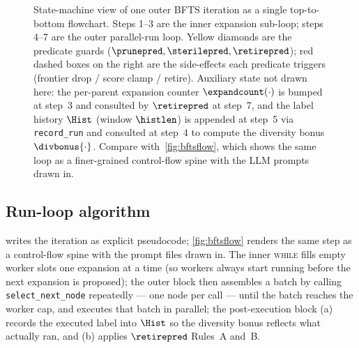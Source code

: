 \begin{figure}[t]
  \centering
  \resizebox{0.85\columnwidth}{!}{}
  \caption{State-machine view of one outer BFTS iteration as a single
           top-to-bottom flowchart. Steps 1--3 are the inner expansion
           sub-loop; steps 4--7 are the outer parallel-run loop. Yellow
           diamonds are the predicate guards ($\prunepred,\sterilepred,\retirepred$);
           red dashed boxes on the right are the side-effects each
           predicate triggers (frontier drop / score clamp / retire).
           Auxiliary state not drawn here: the per-parent expansion
           counter $\expandcount(\cdot)$ is bumped at step~3 and
           consulted by $\retirepred$ at step~7, and the label history
           $\Hist$ (window $\histlen$) is appended at step~5 via
           \texttt{record\_run} and consulted at step~4 to compute the
           diversity bonus $\divbonus{\cdot}$.
           Compare with~\cref{fig:bftsflow}, which shows the same loop
           as a finer-grained control-flow spine with the LLM prompts
           drawn in.}
  \label{fig:bfts-state}
\end{figure}

\subsection{Run-loop algorithm}\label{sec:exploration:run-loop}

 writes the iteration as explicit pseudocode;
\cref{fig:bftsflow} renders the same step as a control-flow spine
with the prompt files drawn in.
The inner \textsc{while} fills empty worker slots one expansion at a
time (so workers always start running before the next expansion is
proposed); the outer block then assembles a batch by calling
\texttt{select\_next\_node} repeatedly --- one node per call --- until
the batch reaches the worker cap, and executes that batch in parallel;
the post-execution block (a) records the executed label into $\Hist$
so the diversity bonus reflects what actually ran, and (b) applies
$\retirepred$ Rules~A and~B.

